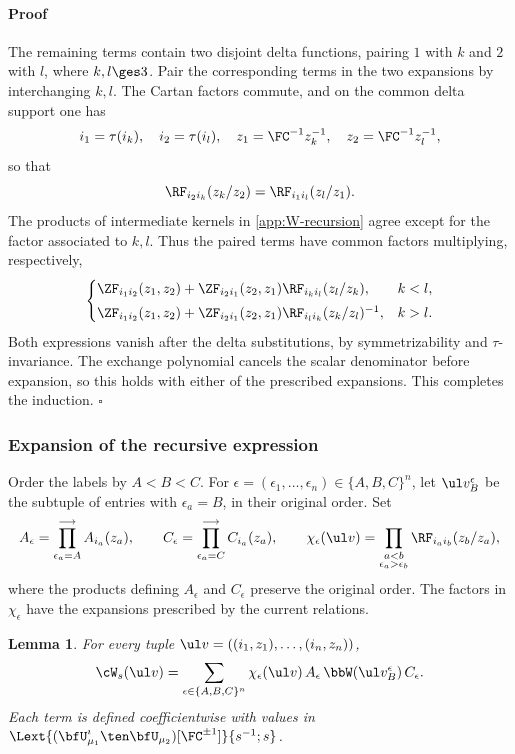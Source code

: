 \documentclass[reqno]{amsart}
\numberwithin{equation}{section}
\newtheorem*{lemma}{Lemma}
\newenvironment{pf}{\medskip\paragraph{{\sc Proof}}}{\hfill$\square$\par\medskip}
\begin{document}
\begin{pf}
	The remaining terms contain two disjoint delta functions, pairing $1$ with
	$k$ and $2$ with $l$, where $k,l\ges3$. Pair the corresponding terms in
	the two expansions by interchanging $k,l$. The Cartan factors commute,
	and on the common delta support one has
	\[
	i_1=\tau(i_k),\quad i_2=\tau(i_l),\quad
	z_1={\FC^{-1}z_k^{-1}},\quad z_2={\FC^{-1}z_l^{-1}},
	\]
	so that
	\[
	\RF_{i_2i_k}(z_k/z_2)=\RF_{i_1i_l}(z_l/z_1).
	\]
	The products of intermediate kernels in \eqref{app:W-recursion} agree
	except for the factor associated to $k,l$. Thus the paired terms have
	common factors multiplying, respectively,
	\begin{equation}
		\begin{cases}
			\ZF_{i_1i_2}(z_1,z_2)
			+\ZF_{i_2i_1}(z_2,z_1)\RF_{i_ki_l}(z_l/z_k),&k<l,\\[1mm]
			\ZF_{i_1i_2}(z_1,z_2)
			+\ZF_{i_2i_1}(z_2,z_1)\RF_{i_li_k}(z_k/z_l)^{-1},&k>l.
		\end{cases}
		\label{app:d-d-factors}
	\end{equation}
	Both expressions vanish after the delta substitutions, by
	symmetrizability and $\tau$-invariance. The exchange polynomial cancels
	the scalar denominator before expansion, so this holds with either of
	the prescribed expansions. This completes the induction.
\end{pf}

\subsubsection{Expansion of the recursive expression}
\label{app:reduction-lemma}
Order the labels by $A<B<C$. For 
$\epsilon=(\epsilon_1,\ldots,\epsilon_n)\in\{A,B,C\}^n$, let $\ul v_B^\epsilon$ be the 
subtuple of entries with $\epsilon_a=B$, in their original order. Set
\[
A_\epsilon=\prod_{\epsilon_a=A}^{\longrightarrow}A_{i_a}(z_a),\qquad
C_\epsilon=\prod_{\epsilon_a=C}^{\longrightarrow}C_{i_a}(z_a),\qquad
\chi_\epsilon(\ul v)=
\prod_{\substack{a<b\\ \epsilon_a>\epsilon_b}}
\RF_{i_ai_b}(z_b/z_a),
\]
where the products defining $A_\epsilon$ and $C_\epsilon$ preserve the original order. 
The factors in $\chi_\epsilon$ have the expansions prescribed by the current relations.

\begin{lemma}
	For every tuple $\ul v=((i_1,z_1),\ldots,(i_n,z_n))$,
	\begin{equation}
		\cW_s(\ul v)=
		\sum_{\epsilon\in\{A,B,C\}^n}
		\chi_\epsilon(\ul v)\,
		A_\epsilon\,\bbW(\ul v_B^\epsilon)\,C_\epsilon .
		\label{app:induction-formula}
	\end{equation}
	Each term is defined coefficientwise with values in
		$\Lext{(\bfU^\imath_{\mu_1}\ten\bfU_{\mu_2})[\FC^{\pm1}]}{s^{-1};s}$.
\end{lemma}
\end{document}
